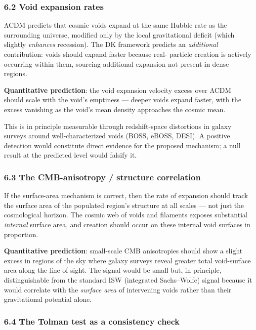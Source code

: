 \documentclass[
]{article}
\begin{document}
\subsubsection{6.2 Void expansion rates}\label{void-expansion-rates}

ΛCDM predicts that cosmic voids expand at the same Hubble rate as the
surrounding universe, modified only by the local gravitational deficit
(which slightly \emph{enhances} recession). The DK framework predicts an
\emph{additional} contribution: voids should expand faster because real-
particle creation is actively occurring within them, sourcing additional
expansion not present in dense regions.

\textbf{Quantitative prediction}: the void expansion velocity excess
over ΛCDM should scale with the void's emptiness --- deeper voids expand
faster, with the excess vanishing as the void's mean density approaches
the cosmic mean.

This is in principle measurable through redshift-space distortions in
galaxy surveys around well-characterized voids (BOSS, eBOSS, DESI). A
positive detection would constitute direct evidence for the proposed
mechanism; a null result at the predicted level would falsify it.

\subsubsection{6.3 The CMB-anisotropy / structure
correlation}\label{the-cmb-anisotropy-structure-correlation}

If the surface-area mechanism is correct, then the rate of expansion
should track the surface area of the populated region's structure at all
scales --- not just the cosmological horizon. The cosmic web of voids
and filaments exposes substantial \emph{internal} surface area, and
creation should occur on these internal void surfaces in proportion.

\textbf{Quantitative prediction}: small-scale CMB anisotropies should
show a slight excess in regions of the sky where galaxy surveys reveal
greater total void-surface area along the line of sight. The signal
would be small but, in principle, distinguishable from the standard ISW
(integrated Sachs--Wolfe) signal because it would correlate with the
\emph{surface area} of intervening voids rather than their gravitational
potential alone.

\subsubsection{6.4 The Tolman test as a consistency
check}\label{the-tolman-test-as-a-consistency-check}
\end{document}
